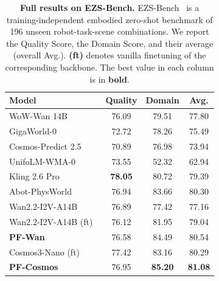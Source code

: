 \begin{table}[t]
\centering
\renewcommand{\arraystretch}{1.15}
\setlength{\tabcolsep}{10pt}
\caption{\textbf{Full results on EZS-Bench.} EZS-Bench~\cite{ali2025abot} is a training-independent embodied zero-shot benchmark of 196 unseen robot-task-scene combinations. We report the Quality Score, the Domain Score, and their average (overall Avg.). \textbf{(ft)} denotes vanilla finetuning of the corresponding backbone. The best value in each column is in \textbf{bold}.}
\label{tab:ezsbench_full}
\begin{tabular}{l ccc}
\toprule
\textbf{Model} & \textbf{Quality} & \textbf{Domain} & \textbf{Avg.} \\
\midrule
WoW-Wan 14B~\cite{chi2025wow}        & 76.09 & 79.51 & 77.80 \\
GigaWorld-0~\cite{team2025gigaworld} & 72.72 & 78.26 & 75.49 \\
Cosmos-Predict 2.5~\cite{ali2025world} & 70.89 & 76.98 & 73.94 \\
UnifoLM-WMA-0~\cite{unifolm-wma-0}   & 73.55 & 52.32 & 62.94 \\
Kling 2.6 Pro~\cite{kling2025}       & \textbf{78.05} & 80.72 & 79.39 \\
Abot-PhysWorld~\cite{ali2025abot}    & 76.94 & 83.66 & 80.30 \\
Wan2.2-I2V-A14B~\cite{wan2025wan}        & 76.89 & 77.42 & 77.16 \\
\midrule
Wan2.2-I2V-A14B (ft)~\cite{wan2025wan}   & 76.12 & 81.95 & 79.04 \\
\quad \textbf{PF-Wan}                & 76.58 & 84.49 & 80.54 \\
Cosmos3-Nano (ft)                    & 77.42 & 83.16 & 80.29 \\
\quad \textbf{PF-Cosmos}             & 76.95 & \textbf{85.20} & \textbf{81.08} \\
\bottomrule
\end{tabular}
\end{table}
